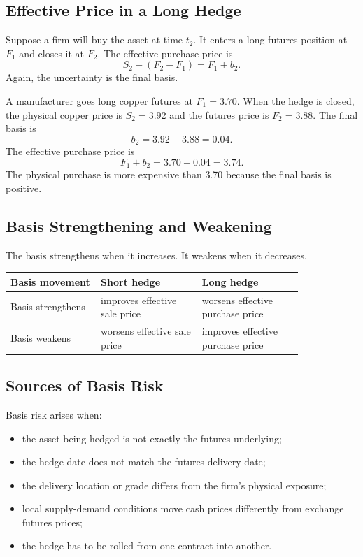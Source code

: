 \subsection{Effective Price in a Long Hedge}

Suppose a firm will buy the asset at time $t_2$. It enters a long futures
position at $F_1$ and closes it at $F_2$. The effective purchase price is
\[
    S_2-(F_2-F_1)=F_1+b_2.
\]
Again, the uncertainty is the final basis.

\begin{exmp}
A manufacturer goes long copper futures at $F_1=3.70$. When the hedge is closed,
the physical copper price is $S_2=3.92$ and the futures price is $F_2=3.88$. The
final basis is
\[
    b_2=3.92-3.88=0.04.
\]
The effective purchase price is
\[
    F_1+b_2=3.70+0.04=3.74.
\]
The physical purchase is more expensive than 3.70 because the final basis is
positive.
\end{exmp}

\subsection{Basis Strengthening and Weakening}

The basis strengthens when it increases. It weakens when it decreases.

\begin{tabular}{@{}p{0.25\linewidth}p{0.29\linewidth}p{0.29\linewidth}@{}}
\toprule
Basis movement & Short hedge & Long hedge \\
\midrule
Basis strengthens & improves effective sale price & worsens effective purchase
price \\
Basis weakens & worsens effective sale price & improves effective purchase
price \\
\bottomrule
\end{tabular}

\subsection{Sources of Basis Risk}

Basis risk arises when:
\begin{itemize}
    \item the asset being hedged is not exactly the futures underlying;
    \item the hedge date does not match the futures delivery date;
    \item the delivery location or grade differs from the firm's physical
    exposure;
    \item local supply-demand conditions move cash prices differently from
    exchange futures prices;
    \item the hedge has to be rolled from one contract into another.
\end{itemize}

